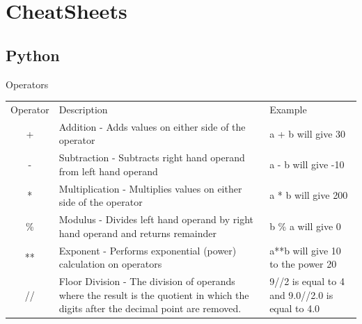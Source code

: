 \documentclass[presentation]{beamer}
\begin{document}
\section{CheatSheets}
\label{sec-10}

\subsection{Python}
\label{sec-10-1}

\begin{frame}[label=sec-10-1-1]{Operators}
\tiny
\begin{center}
\begin{tabular}{|c|p{2in}|l|}
Operator & Description & Example\\
+ & Addition - Adds values on either side of the operator & a + b will give 30\\
- & Subtraction - Subtracts right hand operand from left hand operand & a - b will give -10\\
* & Multiplication - Multiplies values on either side of the operator & a * b will give 200\\
\% & Modulus - Divides left hand operand by right hand operand and returns remainder & b \% a will give 0\\
** & Exponent - Performs exponential (power) calculation on operators & a**b will give 10 to the power 20\\
// & Floor Division - The division of operands where the result is the quotient in which the digits after the decimal point are removed. & 9//2 is equal to 4 and 9.0//2.0 is equal to 4.0\\
\end{tabular}
\end{center}
\end{frame}
\end{document}

